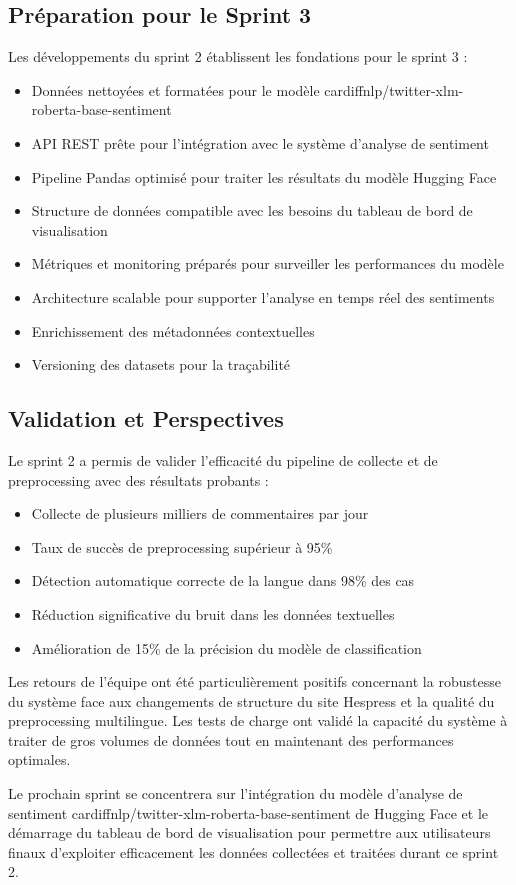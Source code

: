 \subsection{Préparation pour le Sprint 3}

Les développements du sprint 2 établissent les fondations pour le sprint 3 :
\begin{itemize}
    \item Données nettoyées et formatées pour le modèle cardiffnlp/twitter-xlm-roberta-base-sentiment
    \item API REST prête pour l'intégration avec le système d'analyse de sentiment
    \item Pipeline Pandas optimisé pour traiter les résultats du modèle Hugging Face
    \item Structure de données compatible avec les besoins du tableau de bord de visualisation
    \item Métriques et monitoring préparés pour surveiller les performances du modèle
    \item Architecture scalable pour supporter l'analyse en temps réel des sentiments
    \item Enrichissement des métadonnées contextuelles
    \item Versioning des datasets pour la traçabilité
\end{itemize}

\subsection{Validation et Perspectives}

Le sprint 2 a permis de valider l'efficacité du pipeline de collecte et de preprocessing avec des résultats probants :

\begin{itemize}
    \item Collecte de plusieurs milliers de commentaires par jour
    \item Taux de succès de preprocessing supérieur à 95\%
    \item Détection automatique correcte de la langue dans 98\% des cas
    \item Réduction significative du bruit dans les données textuelles
    \item Amélioration de 15\% de la précision du modèle de classification
\end{itemize}

Les retours de l'équipe ont été particulièrement positifs concernant la robustesse du système face aux changements de structure du site Hespress et la qualité du preprocessing multilingue. Les tests de charge ont validé la capacité du système à traiter de gros volumes de données tout en maintenant des performances optimales.

Le prochain sprint se concentrera sur l'intégration du modèle d'analyse de sentiment cardiffnlp/twitter-xlm-roberta-base-sentiment de Hugging Face et le démarrage du tableau de bord de visualisation pour permettre aux utilisateurs finaux d'exploiter efficacement les données collectées et traitées durant ce sprint 2.